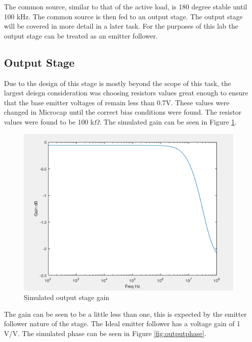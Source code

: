 The common source, similar to that of the active load, is 180 degree stable until 100 kHz.  The common source is then fed to an output stage. The output stage will be covered in more detail in a later task. For the purposes of this lab the output stage can be treated as an emitter follower.

\subsection{Output Stage}

Due to the design of this stage is mostly beyond the scope of this task, the largest deisgn consideration was choosing resistors values great enough to ensure that the base emitter voltages of remain less than 0.7V. These values were changed in Microcap until the correct bias conditions were found. The resistor values were found to be 100 k$\Omega$. The simulated gain can be seen in Figure \ref{fig:outputgain}.

\begin{figure}[H]
	\begin{center}
		\includegraphics[scale=.30]{Simulations/gainlaststage.png}
		\caption{Simulated output stage gain}
		\label{fig:outputgain}
	\end{center}
\end{figure} 

The gain can be seen to be a little less than one, this is expected by the emitter follower nature of the stage. The Ideal emitter follower has a voltage gain of 1 V/V. The simulated phase can be seen in Figure \ref{fig:outputphase}.

